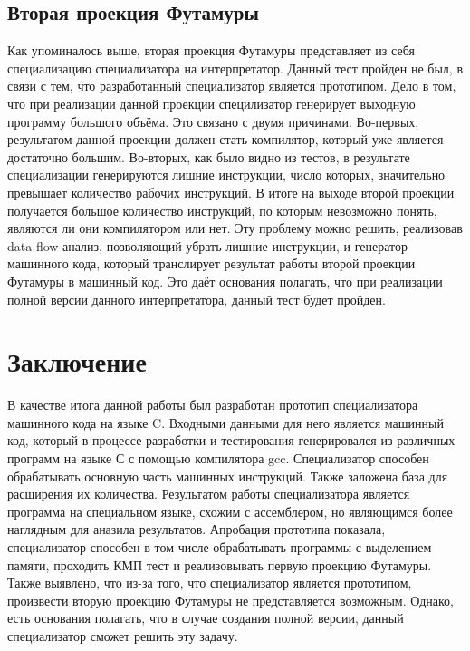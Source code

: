 \subsection{ Вторая проекция Футамуры}
Как упоминалось выше, вторая проекция Футамуры представляет из себя специализацию специализатора на интерпретатор. Данный тест пройден не был, в связи с тем, что разработанный специализатор является прототипом. Дело в том, что при реализации данной проекции специлизатор генерирует выходную программу большого объёма. Это связано с двумя причинами. Во-первых, результатом данной проекции должен стать компилятор, который уже является достаточно большим. Во-вторых, как было видно из тестов, в результате специализации генерируются лишние инструкции, число которых, значительно превышает количество рабочих инструкций. В итоге на выходе второй проекции получается большое количество инструкций, по которым невозможно понять, являются ли они компилятором или нет. Эту проблему можно решить, реализовав data-flow анализ, позволяющий убрать лишние инструкции, и генератор машинного кода, который транслирует результат работы второй проекции Футамуры в машинный код. Это даёт основания полагать, что при реализации полной версии данного интерпретатора, данный тест будет пройден.

\section{Заключение}
В качестве итога данной работы был разработан прототип специализатора машинного кода на языке C. Входными данными для него является машинный код, который в процессе разработки и тестирования генерировался из различных программ на языке С с помощью компилятора gcc. Специализатор способен обрабатывать основную часть машинных инструкций. Также заложена база для расширения их количества. Результатом работы специализатора является программа на специальном языке, схожим с ассемблером, но являющимся более наглядным для аназила результатов. Апробация прототипа показала, специализатор способен в том числе обрабатывать программы с выделением памяти, проходить КМП тест и реализовывать первую проекцию Футамуры. Также выявлено, что из-за того, что специализатор является прототипом, произвести вторую проекцию Футамуры не представляется возможным. Однако, есть основания полагать, что в случае создания полной версии, данный специализатор сможет решить эту задачу.

